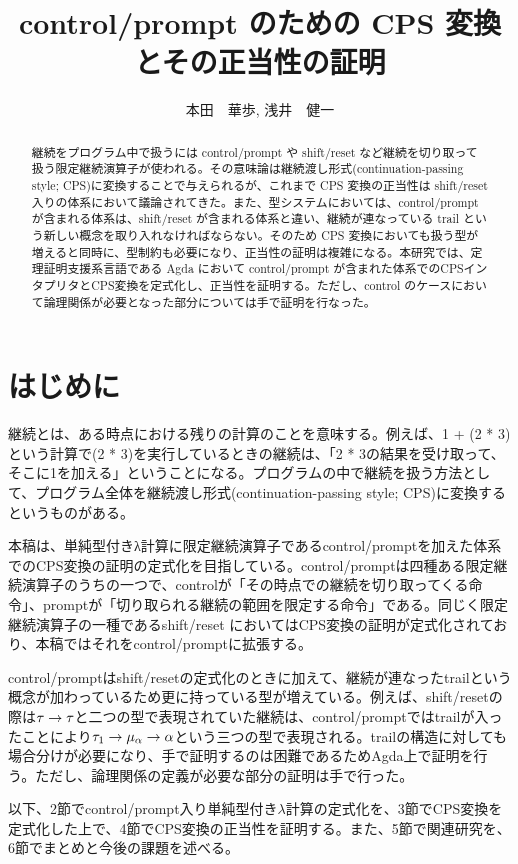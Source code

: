 \documentclass[japanese,draft]{jssst_ppl} %
\title{control/prompt のための CPS 変換とその正当性の証明}
\author{本田　華歩, 浅井　健一}
\begin{document}
\maketitle
\begin{abstract}
継続をプログラム中で扱うには control/prompt や shift/reset など継続を切り取って扱う限定継続演算子が使われる。その意味論は継続渡し形式(continuation-passing style; CPS)に変換することで与えられるが、これまで CPS 変換の正当性は shift/reset 入りの体系において議論されてきた。また、型システムにおいては、control/prompt が含まれる体系は、shift/reset が含まれる体系と違い、継続が連なっている trail という新しい概念を取り入れなければならない。そのため CPS 変換においても扱う型が増えると同時に、型制約も必要になり、正当性の証明は複雑になる。本研究では、定理証明支援系言語である Agda において control/prompt が含まれた体系でのCPSインタプリタとCPS変換を定式化し、正当性を証明する。ただし、control のケースにおいて論理関係が必要となった部分については手で証明を行なった。
\end{abstract}

\section{はじめに}
継続とは、ある時点における残りの計算のことを意味する。例えば、1 + (2 * 3)という計算で(2 * 3)を実行しているときの継続は、「2 * 3の結果を受け取って、そこに1を加える」ということになる。プログラムの中で継続を扱う方法として、プログラム全体を継続渡し形式(continuation-passing style; CPS)に変換するというものがある。

本稿は、単純型付きλ計算に限定継続演算子であるcontrol/prompt\cite{POPL88}を加えた体系でのCPS変換の証明の定式化を目指している。control/promptは四種ある限定継続演算子のうちの一つで、controlが「その時点での継続を切り取ってくる命令」、promptが「切り取られる継続の範囲を限定する命令」である。同じく限定継続演算子の一種であるshift/reset\cite{DF1990} においてはCPS変換の証明が定式化されており、本稿ではそれをcontrol/promptに拡張する。

control/promptはshift/resetの定式化のときに加えて、継続が連なったtrailという概念が加わっているため更に持っている型が増えている。例えば、shift/resetの際は${\tau}\rightarrow{\tau}$と二つの型で表現されていた継続は、control/promptではtrailが入ったことにより${\tau_1}\rightarrow{{\mu_{\alpha}}\rightarrow{\alpha}}$という三つの型で表現される。trailの構造に対しても場合分けが必要になり、手で証明するのは困難であるためAgda上で証明を行う。ただし、論理関係の定義が必要な部分の証明は手で行った。

以下、2節でcontrol/prompt入り単純型付き$\lambda$計算の定式化を、3節でCPS変換を定式化した上で、4節でCPS変換の正当性を証明する。また、5節で関連研究を、6節でまとめと今後の課題を述べる。
\end{document}
